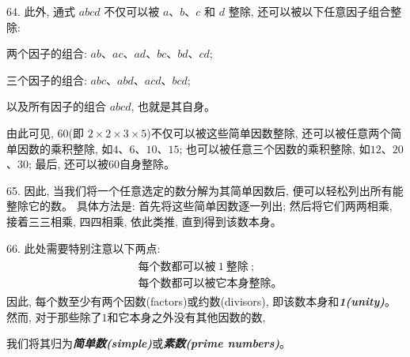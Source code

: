 64. 此外, 通式 $abcd$ 不仅可以被 $a$、$b$、$c$ 和 $d$ 整除, 还可以被以下任意因子组合整除: \par
两个因子的组合: $ab$、$ac$、$ad$、$bc$、$bd$、$cd$; \par
三个因子的组合: $abc$、$abd$、$acd$、$bcd$; \par
以及所有因子的组合 $abcd$, 也就是其自身。\par
由此可见, $60$(即 $2 \times 2 \times 3 \times 5$)不仅可以被这些简单因数整除, 
还可以被任意两个简单因数的乘积整除, 如$4$、$6$、$10$、$15$; 也可以被任意三个因数的乘积整除, 如$12$、$20$、$30$; 最后, 还可以被$60$自身整除。

65. 因此, 当我们将一个任意选定的数分解为其简单因数后, 便可以轻松列出所有能整除它的数。  
具体方法是: 
首先将这些简单因数逐一列出; 然后将它们两两相乘, 接着三三相乘, 四四相乘, 依此类推, 直到得到该数本身。

66. 此处需要特别注意以下两点:
\begin{gather*}
\begin{aligned}
	&\ \text{每个数都可以被}\ 1\ \text{整除}\ ; \\
	&\ \text{每个数都可以被它本身整除。}\ 
\end{aligned}
\end{gather*}
因此, 每个数至少有两个因数(factors)或约数(divisors), 即该数本身和\textbf{\textit{1(unity)}}。
然而, 对于那些除了$1$和它本身之外没有其他因数的数, \par
我们将其归为\textbf{\textit{简单数(simple)}}或\textbf{\textit{素数(prime numbers)}}。  


